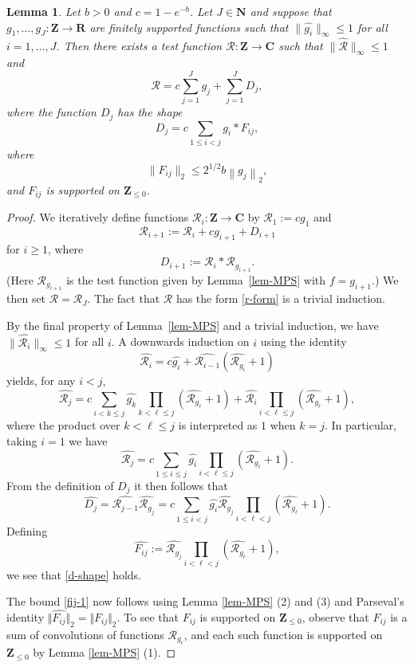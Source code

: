 \documentclass[reqno]{amsart}
\renewcommand{\leq}{\leqslant}
\renewcommand{\geq}{\geqslant}
\newcommand{\ri}{\mathcal{R}}
\newcommand{\bbn}{\mathbf{N}}
\newcommand{\bbz}{\mathbf{Z}}
\newcommand{\bbr}{\mathbf{R}}
\newcommand{\bbc}{\mathbf{C}}
\newcommand{\norm}[1]{\left\lVert #1\right\rVert}
\numberwithin{equation}{section}
\newtheorem{lemma}[theorem]{Lemma}
\theoremstyle{definition}
\theoremstyle{remark}
\begin{document}
\begin{lemma}\label{lem-test}
Let $b>0$ and $c=1-e^{-b}$. Let $J \in \bbn$ and suppose that $g_1,\ldots,g_J:\bbz\to \bbr$ are finitely supported functions such that $\| \widehat{g_i}\|_\infty\leq 1$ for all $i = 1,\dots,J$. Then there exists a test function $\ri:\bbz\to \bbc$ such that $\| \widehat{\ri}\|_\infty \leq 1$ and
\begin{equation}\label{r-form}\ri = c\sum_{j=1}^J g_j+\sum_{j=1}^JD_j,\end{equation}
where the function $D_j$ has the shape
\begin{equation}\label{d-shape} D_j = c\sum_{1\leq i<j}g_i\ast F_{ij},\end{equation}
where
\begin{equation}\label{fij-1} \| F_{ij}\|_2\leq 2^{1/2}b\norm{g_j}_2,\end{equation} and $F_{ij}$ is supported on $\bbz_{\leq 0}$.
\end{lemma}
\begin{proof}
We iteratively define functions $\ri_i : \bbz \rightarrow \bbc$ by $\ri_1 :=cg_1$ and
\[\ri_{i+1} :=\ri_i+cg_{i+1}+D_{i+1}\] for $i \geq 1$, where
\[D_{i+1} :=\ri_i\ast \ri_{g_{i+1}}.\]
(Here $\ri_{g_{i+1}}$ is the test function given by Lemma~\ref{lem-MPS} with $f=g_{i+1}$.) We then set $\ri=\ri_J$. The fact that $\ri$ has the form \eqref{r-form} is a trivial induction. 

By the final property of Lemma~\ref{lem-MPS} and a trivial induction, we have $\|\widehat{\ri_i}\|_\infty\leq 1$ for all $i$. A downwards induction on $i$ using the identity
\[\widehat{\ri_{i}}=c\widehat{g_{i}}+\widehat{\ri_{i - 1}}(\widehat{\ri_{g_{i}}}+1)\]
yields, for any $i<j$,
\[\widehat{\ri_j}=c\sum_{i<k\leq j}\widehat{g_k}\prod_{k<\ell\leq j}(\widehat{\ri_{g_\ell}}+1)+\widehat{\ri_i}\prod_{i<\ell\leq j}(\widehat{\ri_{g_\ell}}+1),\] where the product over $k < \ell \leq j$ is interpreted as $1$ when $k = j$.
In particular, taking $i = 1$ we have
\[\widehat{\ri_{j}}=c\sum_{1\leq i\leq j}\widehat{g_i}\prod_{i< \ell\leq j}(\widehat{\ri_{g_\ell}}+1).\]
From the definition of $D_j$ it then follows that
\[\widehat{D_j}=\widehat{\ri_{j-1}}\widehat{\ri_{g_j}}=c\sum_{1\leq i<j}\widehat{g_i}\widehat{\ri_{g_j}}\prod_{i< \ell<j}(\widehat{\ri_{g_\ell}}+1).\]
Defining
\[\widehat{F_{ij}} :=\widehat{\ri_{g_j}}\prod_{i< \ell < j}(\widehat{\ri_{g_\ell}}+1),\] we see that \eqref{d-shape} holds.

The bound \eqref{fij-1} now follows using Lemma \ref{lem-MPS} (2) and (3) and Parseval's identity $\Vert \widehat{F_{ij}} \Vert_2 = \Vert F_{ij} \Vert_2$. To see that $F_{ij}$ is supported on $\bbz_{\leq 0}$, observe that $F_{ij}$ is a sum of convolutions of functions $\mathcal{R}_{g_\ell}$, and each such function is supported on $\bbz_{\leq 0}$ by Lemma \ref{lem-MPS} (1).
\end{proof}
\end{document}
